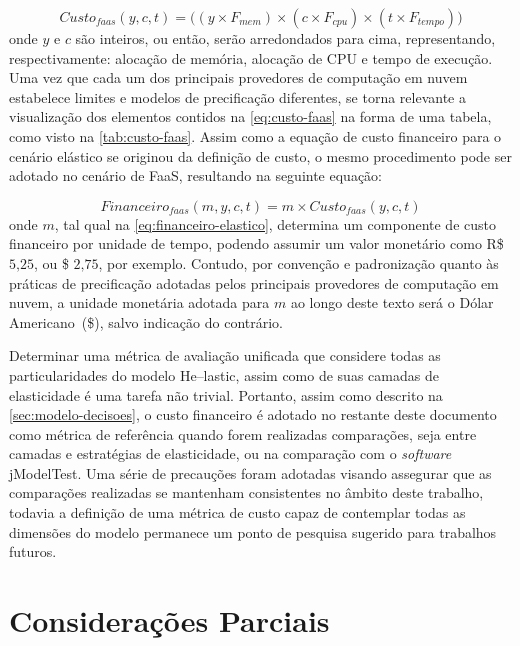 \documentclass[english,brazilian]{UNISINOSmonografia} %
\begin{document}
\begin{equation}
\label{eq:custo-faas}
Custo_{faas}(y,c,t) = \big( (y \times F_{mem}) \times (c \times F_{cpu}) \times (t \times F_{tempo}) \big)
\end{equation}
onde $ y $ e $ c $ são inteiros, ou então, serão arredondados para cima, representando, respectivamente: alocação de memória, alocação de CPU e tempo de execução.
Uma vez que cada um dos principais provedores de computação em nuvem estabelece limites e modelos de precificação diferentes, se torna relevante a visualização dos elementos contidos na \autoref{eq:custo-faas} na forma de uma tabela, como visto na \autoref{tab:custo-faas}.
Assim como a equação de custo financeiro para o cenário elástico se originou da definição de custo, o mesmo procedimento pode ser adotado no cenário de FaaS, resultando na seguinte equação:

\begin{equation}
\label{eq:financeiro-faas}
Financeiro_{faas}(m,y,c,t) = m \times Custo_{faas}(y,c,t)
\end{equation}
onde $ m $, tal qual na \autoref{eq:financeiro-elastico}, determina um componente de custo financeiro por unidade de tempo, podendo assumir um valor monetário como R\$ $ 5\text{,}25 $,  ou \$ $2\text{,}75$, por exemplo.
Contudo, por convenção e padronização quanto às práticas de precificação adotadas pelos principais provedores de computação em nuvem, a unidade monetária adotada para $ m $ ao longo deste texto será o Dólar Americano~(\$), salvo indicação do contrário.



Determinar uma métrica de avaliação unificada que considere todas as particularidades do modelo \textsf{He}--lastic, assim como de suas camadas de elasticidade é uma tarefa não trivial.
%
Portanto, assim como descrito na \autoref{sec:modelo-decisoes}, o custo financeiro é adotado no restante deste documento como métrica de referência quando forem realizadas comparações, seja entre camadas e estratégias de elasticidade, ou na comparação com o \textit{software} jModelTest.
%
Uma série de precauções foram adotadas visando assegurar que as comparações realizadas se mantenham consistentes no âmbito deste trabalho, todavia a definição de uma métrica de custo capaz de contemplar todas as dimensões do modelo permanece um ponto de pesquisa sugerido para trabalhos futuros.



\section{Considerações Parciais}
\end{document}
